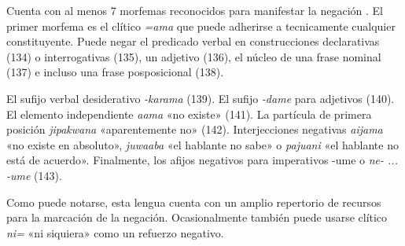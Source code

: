 Cuenta con al menos 7 morfemas reconocidos para manifestar la negación \textcolor{MidnightBlue}{\citep{cavin}}. El primer morfema es el clítico {\setmainfont{Charis SIL} \textit{=ama}} que puede adherirse a tecnicamente cualquier constituyente. Puede negar el predicado verbal en construcciones declarativas (134) o interrogativas (135), un adjetivo (136), el núcleo de una frase nominal (137) e incluso una frase posposicional (138).

El sufijo verbal desiderativo {\setmainfont{Charis SIL} \textit{-karama}} (139). El sufijo {\setmainfont{Charis SIL} \textit{-dame}} para adjetivos (140). El elemento independiente {\setmainfont{Charis SIL} \textit{aama}} «no existe» (141). La partícula de primera posición {\setmainfont{Charis SIL} \textit{jipakwana}} «aparentemente no» (142). Interjecciones negativas {\setmainfont{Charis SIL} \textit{aijama}} «no existe en absoluto», {\setmainfont{Charis SIL} \textit{juwaaba}} «el hablante no sabe» o {\setmainfont{Charis SIL} \textit{pajuani}} «el hablante no está de acuerdo». Finalmente, los afijos negativos para imperativos {\setmainfont{Charis SIL} -ume} o {\setmainfont{Charis SIL} \textit{ne- ... -ume}} (143).

Como puede notarse, esta lengua cuenta con un amplio repertorio de recursos para la marcación de la negación. Ocasionalmente también puede usarse clítico{\setmainfont{Charis SIL} \textit{ni=}} «ni siquiera» como un refuerzo negativo.